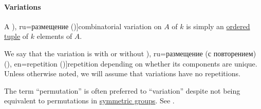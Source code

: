 \paragraph{Variations}

\begin{definition}\label{def:combinatorial_variation}\mimprovised
  A \term[bg=вариация (\cite[27]{ДимитровЯнев2007Статистика}), ru=размещение (\cite[3]{БелоусовВласов2012Комбинаторика})]{combinatorial variation} on \( A \) of  \( k \) is simply an \hyperref[def:ordered_tuple]{ordered tuple} of \( k \) elements of \( A \).

  We say that the variation is with or without \term[bg=(вариация с) повторение (\cite[27]{ДимитровЯнев2007Статистика}), ru=размещение (с повторением) (\cite[3]{БелоусовВласов2012Комбинаторика}), en=repetition (\cite[446]{Rosen2019DiscreteMathematics})]{repetition} depending on whether its components are unique. Unless otherwise noted, we will assume that variations have no repetitions.
\end{definition}
\begin{comments}
  \item The term \enquote{permutation} is often preferred to \enquote{variation} despite not being equivalent to permutations in \hyperref[def:symmetric_group]{symmetric groups}. See .
\end{comments}

